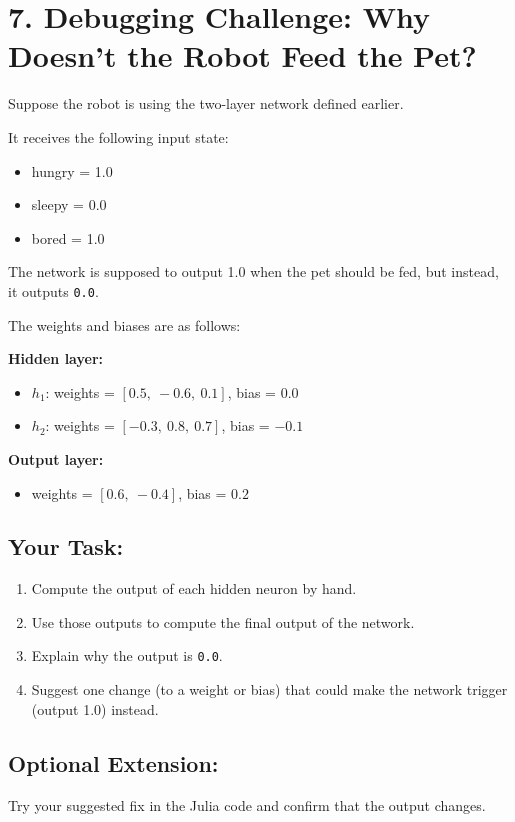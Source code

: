 \documentclass{book}
\begin{document}
\section*{7. Debugging Challenge: Why Doesn’t the Robot Feed the Pet?}

Suppose the robot is using the two-layer network defined earlier.

It receives the following input state:
\begin{itemize}
  \item hungry = 1.0
  \item sleepy = 0.0
  \item bored = 1.0
\end{itemize}

The network is supposed to output 1.0 when the pet should be fed, but instead, it outputs \texttt{0.0}.

The weights and biases are as follows:

\textbf{Hidden layer:}
\begin{itemize}
  \item $h_1$: weights = $[0.5,\ -0.6,\ 0.1]$, bias = $0.0$
  \item $h_2$: weights = $[-0.3,\ 0.8,\ 0.7]$, bias = $-0.1$
\end{itemize}

\textbf{Output layer:}
\begin{itemize}
  \item weights = $[0.6,\ -0.4]$, bias = $0.2$
\end{itemize}

\subsection*{Your Task:}

\begin{enumerate}
  \item Compute the output of each hidden neuron by hand.
  \item Use those outputs to compute the final output of the network.
  \item Explain why the output is \texttt{0.0}.
  \item Suggest one change (to a weight or bias) that could make the network trigger (output 1.0) instead.
\end{enumerate}

\subsection*{Optional Extension:}

Try your suggested fix in the Julia code and confirm that the output changes.
\end{document}

